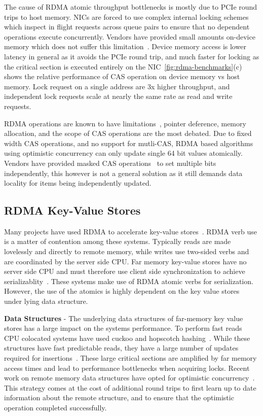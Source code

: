 The cause of RDMA atomic throughput bottlenecks is mostly
due to PCIe round trips to host memory. NICs are forced to
use complex internal locking schemes which inspect in flight
requests across queue pairs to ensure that no dependent
operations execute concurrently. Vendors have provided small
amounts on-device memory which does not suffer this
limitation~\cite{device-memory}. Device memory access is
lower latency in general as it avoids the PCIe round trip,
and much faster for locking as the critical section is
executed entirely on the NIC~\ref{fig:rdma-benchmarks}(c)
shows the relative performance of CAS operation on device
memory vs host memory. Lock request on a single address are
3x higher throughput, and independent lock requests scale at
nearly the same rate as read and write requests.

RDMA operations are known to have limitations~\cite{prism},
pointer deference, memory allocation, and the scope of CAS
operations are the most debated. Due to fixed width CAS
operations, and no support for mutli-CAS, RDMA based
algorithms using optimistic concurrency can only update
single 64 bit values atomically. Vendors have provided
masked CAS operations~\cite{rdma-masked-cas} to set multiple
bits independently, this however is not a general solution
as it still demands data locality for items being
independently updated.


\subsection{RDMA Key-Value Stores}

Many projects have used RDMA to accelerate key-value
stores~\cite{farm,erpc,herd,mica,pilaf,cell,faast,storm,memc3}.
RDMA verb use is a matter of contention among these systems.
Typically reads are made lovelessly and directly to remote
memory, while writes use two-sided verbs and are coordinated
by the server side CPU.
Far memory key-value stores have no server side CPU and must
therefore use client side synchronization to achieve
serializablity~\cite{rolex,fusee,clover,sherman,ford,race}.
These systems make use of RDMA atomic verbs for
serialization. However, the use of the atomics is highly
dependent on the key value stores under lying data
structure.

\textbf{Data Structures} - The underlying data structures of
far-memory key value stores has a large impact on the
systems performance. To perform fast reads CPU colocated
systems have used cuckoo and hopscotch
hashing~\cite{pilaf,herd,cuckoo,hopscotch}. While these
structures have fast predictable reads, they have a large
number of updates required for
insertions~\cite{pilaf,cuckoo-improvements,memc3}. These
large critical sections are amplified by far memory access
times and lead to performance bottlenecks when acquiring
locks. Recent work on remote memory data structures have
opted for optimistic concurrency~\cite{clover,race,ford}.
This strategy comes at the cost of additional round trips to
first learn up to date information about the remote
structure, and to ensure that the optimistic operation
completed successfully.

